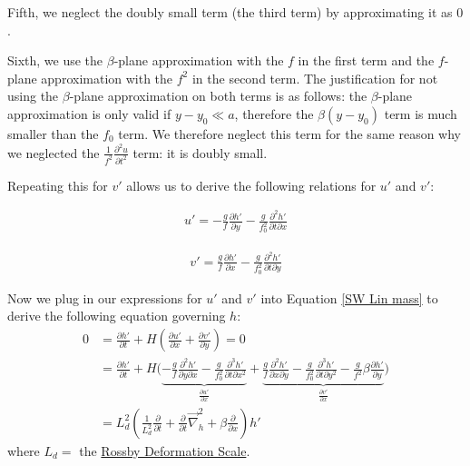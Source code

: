 Fifth, we neglect the doubly small term (the third term) by approximating it as \(0\).

Sixth, we use the \(\beta\)-plane approximation with the \(f\) in the first term and the \(f\)-plane approximation with the \(f^2\) in the second term. The justification for not using the \(\beta\)-plane approximation on both terms is as follows: the \(\beta\)-plane approximation is only valid if \(y-y_0\ll a\), therefore the \(\beta (y-y_0)\) term is much smaller than the \(f_0\) term. We therefore neglect this term for the same reason why we neglected the \(\frac{1}{f^2}\frac{\partial^2 u}{\partial t^2}\) term: it is doubly small. 

Repeating this for \(v'\) allows us to derive the following relations for \(u'\) and \(v'\):

\begin{minipage}{.48\linewidth}
    \begin{align*}
        u'=-\frac{g}{f}\frac{\partial h'}{\partial y}-\frac{g}{f_0^2}\frac{\partial^2 h'}{\partial t \partial x}
    \end{align*}
\end{minipage}
\hfill
\begin{minipage}{0.48\linewidth}
    \begin{align*}
        v'=\frac{g}{f}\frac{\partial h'}{\partial x}-\frac{g}{f_0^2}\frac{\partial^2 h'}{\partial t \partial y}
    \end{align*}
\end{minipage}

Now we plug in our expressions for \(u'\) and \(v'\) into Equation \ref{SW Lin mass} to derive the following equation governing \(h\):
\begin{align*}
    0&=\frac{\partial h'}{\partial t}+H\left( \frac{\partial u'}{\partial x}+\frac{\partial v'}{\partial y} \right)=0
    \\
    &= \frac{\partial h'}{\partial t}+H\biggl( 
        \underbrace{-\frac{g}{f}\frac{\partial^2 h'}{\partial y \partial x}-\frac{g}{f_0^2}\frac{\partial^3 h'}{\partial t \partial x^2}}_{\frac{\partial u'}{\partial x}}
        +
        \underbrace{\frac{g}{f}\frac{\partial^2 h'}{\partial x\partial y}-\frac{g}{f_0^2}\frac{\partial^3 h'}{\partial t \partial y^2}
        -\frac{g}{f^2}\beta \frac{\partial h'}{\partial y}}_{\frac{\partial v'}{\partial x}}
     \biggr)
    \\
    &=L_d^2\left( \frac{1}{L_d^2}\frac{\partial}{\partial t} + \frac{\partial}{\partial t}\vec{\nabla}_h^2 + \beta \frac{\partial}{\partial x}\right)h'
\end{align*}
where \(L_d=\) the \hyperref[SW Def Radius Box]{Rossby Deformation Scale}.

